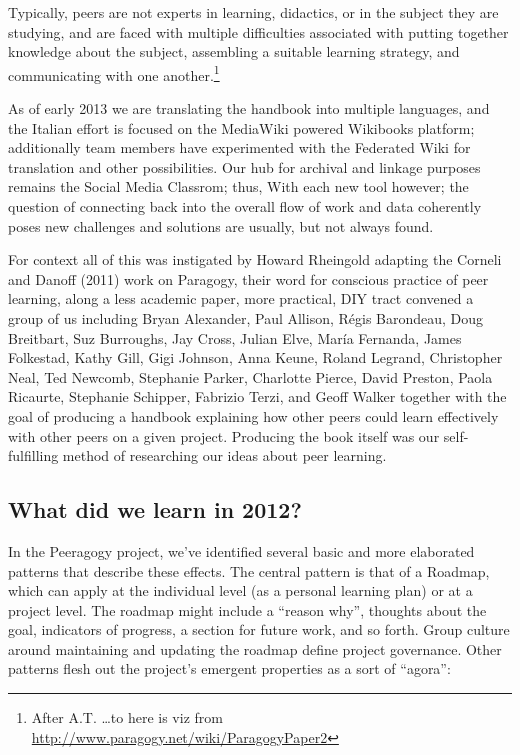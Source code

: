 \documentclass{acm_proc_article-sp}
\begin{document}
Typically, peers are not experts in learning, didactics, or in the subject they are studying, and are faced with multiple difficulties associated with putting together knowledge about the subject, assembling a suitable learning strategy, and communicating with one another.\footnote{After A.T. \ldots to here is viz from \url{http://www.paragogy.net/wiki/ParagogyPaper2}}

As of early 2013 we are translating the handbook into multiple languages, and the Italian effort is focused on the MediaWiki powered Wikibooks platform; additionally team members have experimented with the Federated Wiki for translation and other possibilities. Our hub for archival and linkage purposes remains the Social Media Classrom; thus, With each new tool however; the question of connecting back into the overall flow of work and data coherently poses new challenges and solutions are usually, but not always found.

For context all of this was instigated by Howard Rheingold adapting the Corneli and Danoff (2011) work on Paragogy, their word for conscious practice of peer learning, along a less academic paper, more practical, DIY tract convened a group of us including Bryan Alexander, Paul Allison, R\'egis Barondeau, Doug Breitbart, Suz Burroughs, Jay Cross, Julian Elve, Mar\'ia Fernanda, James Folkestad, Kathy Gill, Gigi Johnson, Anna Keune, Roland Legrand, Christopher Neal, Ted Newcomb, Stephanie Parker, Charlotte Pierce, David Preston, Paola Ricaurte, Stephanie Schipper, Fabrizio Terzi, and Geoff Walker together with the goal of producing a handbook explaining how other peers could learn effectively with other peers on a given project. Producing the book itself was our self-fulfilling method of researching our ideas about peer learning.

\subsection{What did we learn in 2012?}

In the Peeragogy project, we've identified several basic and more elaborated patterns that describe these effects. The central pattern is that of a Roadmap, which can apply at the individual level (as a personal learning plan) or at a project level. The roadmap might include a ``reason why'', thoughts about the goal, indicators of progress, a section for future work, and so forth. Group culture around maintaining and updating the roadmap define project governance. Other patterns flesh out the project's emergent properties as a sort of ``agora'':
\end{document}

